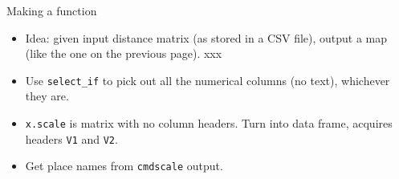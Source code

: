 \documentclass[ignorenonframetext,]{beamer}
\newenvironment{Shaded}{\begin{snugshade}}{\end{snugshade}}
\newcommand{\CommentTok}[1]{\textcolor[rgb]{0.56,0.35,0.01}{\textit{#1}}}
\newcommand{\ControlFlowTok}[1]{\textcolor[rgb]{0.13,0.29,0.53}{\textbf{#1}}}
\newcommand{\DataTypeTok}[1]{\textcolor[rgb]{0.13,0.29,0.53}{#1}}
\newcommand{\KeywordTok}[1]{\textcolor[rgb]{0.13,0.29,0.53}{\textbf{#1}}}
\newcommand{\NormalTok}[1]{#1}
\newcommand{\OperatorTok}[1]{\textcolor[rgb]{0.81,0.36,0.00}{\textbf{#1}}}
\newcommand{\StringTok}[1]{\textcolor[rgb]{0.31,0.60,0.02}{#1}}
\providecommand{\tightlist}{%
  \setlength{\itemsep}{0pt}\setlength{\parskip}{0pt}}
\begin{document}
\begin{frame}[fragile]{Making a function}
\protect\hypertarget{making-a-function}{}

\begin{itemize}
\tightlist
\item
  Idea: given input distance matrix (as stored in a CSV file), output a
  map (like the one on the previous page). xxx
\end{itemize}

\scriptsize

\begin{Shaded}
\end{Shaded}

\normalsize

\begin{itemize}
\item
  Use \texttt{select\_if} to pick out all the numerical columns (no
  text), whichever they are.
\item
  \texttt{x.scale} is matrix with no column headers. Turn into data
  frame, acquires headers \texttt{V1} and \texttt{V2}.
\item
  Get place names from \texttt{cmdscale} output.
\end{itemize}

\end{frame}
\end{document}
